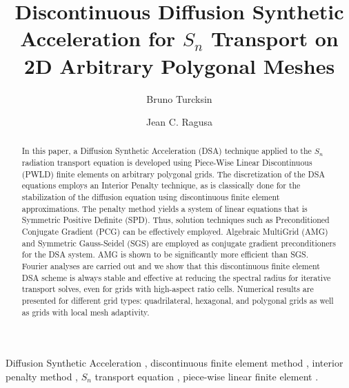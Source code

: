 \documentclass[preprint,10pt]{elsarticle}
\renewcommand{\(}{\left(}
\renewcommand{\)}{\right)}
\renewcommand{\[}{\left[}
\renewcommand{\]}{\right]}
\newcommand{\sn}{\ensuremath{S_n}\xspace}
\begin{document}
\begin{frontmatter}

\title{Discontinuous Diffusion Synthetic Acceleration for \sn Transport on
2D Arbitrary Polygonal Meshes}

\author{Bruno Turcksin }

\author{Jean C. Ragusa}

\address[label1]{Department of Nuclear Engineering, Texas A\&M University 
  College Station, TX 77843, USA }


\begin{abstract}
	In this paper, a Diffusion Synthetic Acceleration (DSA) technique applied to the \sn radiation transport equation
	is developed using Piece-Wise Linear Discontinuous (PWLD) finite elements on arbitrary polygonal grids.
%	
  The discretization of the DSA equations employs an Interior Penalty technique, as is classically done for the stabilization of  
  the diffusion equation using discontinuous finite element approximations.
  The penalty method yields a system of linear equations that  
  is Symmetric Positive Definite (SPD). Thus, solution techniques such as Preconditioned 
	Conjugate Gradient (PCG) can be effectively employed. 
	Algebraic MultiGrid (AMG) and Symmetric Gauss-Seidel (SGS) are employed as conjugate gradient preconditioners for the DSA 
	system. AMG is shown to be significantly more efficient than SGS.
%
	Fourier analyses are carried out and we show that this discontinuous finite element DSA scheme is
  always stable and effective at reducing the spectral radius for iterative transport
  solves, even for grids with high-aspect ratio cells.
  Numerical results are presented for different grid types: quadrilateral, hexagonal, and polygonal grids as well as grids
	with local mesh adaptivity. 
%
\end{abstract}

\begin{keyword}
Diffusion Synthetic Acceleration \sep
discontinuous finite element method \sep
interior penalty method \sep
$S_n$ transport equation \sep
piece-wise linear finite element .
\end{keyword}
\end{frontmatter}
\end{document}
